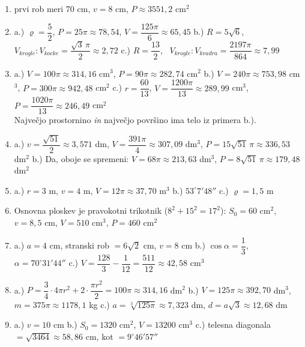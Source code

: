 \documentclass[a4paper,11pt]{letter}
\begin{document}
\begin{enumerate}
\item prvi rob meri 70 cm, $v=8$ cm, $P\approx 3551{,}2$ cm$^2$

\item a.) $\varrho=\dfrac{5}{2}$, $P=25\pi\approx 78{,}54$, $V=\dfrac{125\pi}{6}\approx 65{,}45$ \quad
      b.) $R=5\sqrt{6}$, \ $V_{krogle}:V_{kocke}=\dfrac{\sqrt{3}\,\pi}{2}\approx 2{,}72$ \quad
      c.) $R=\dfrac{13}{2}$, \ $V_{krogle}:V_{kvadra}=\dfrac{2197\pi}{864}\approx 7{,}99$

\item a.) $V=100\pi\approx 314{,}16$ cm$^3$, $P=90\pi\approx 282{,}74$ cm$^2$ \quad
      b.) $V=240\pi\approx 753{,}98$ cm$^3$, $P=300\pi\approx 942{,}48$ cm$^2$ \quad
      c.) $r=\dfrac{60}{13}$, $V=\dfrac{1200\pi}{13}\approx 289{,}99$ cm$^3$,
      $P=\dfrac{1020\pi}{13}\approx 246{,}49$ cm$^2$ \\
      Največjo prostornino \emph{in} največjo površino ima telo iz primera b.).

\item a.) $v=\dfrac{\sqrt{51}}{2}\approx 3{,}571$ dm, $V=\dfrac{391\pi}{4}\approx 307{,}09$ dm$^3$,
      $P=15\sqrt{51}\,\pi\approx 336{,}53$ dm$^2$ \quad
      b.) Da, oboje se spremeni: $V=68\pi\approx 213{,}63$ dm$^3$,
      $P=8\sqrt{51}\,\pi\approx 179{,}48$ dm$^2$

\item a.) $r=3$ m, $v=4$ m, $V=12\pi\approx 37{,}70$ m$^3$ \quad
      b.) $53^{\circ}7'48''$ \quad
      c.) $\varrho=1{,}5$ m

\item Osnovna ploskev je pravokotni trikotnik ($8^2+15^2=17^2$): $S_0=60$ cm$^2$, $v=8{,}5$ cm,
      $V=510$ cm$^3$, $P=460$ cm$^2$

\item a.) $a=4$ cm, stranski rob $=6\sqrt{2}$ cm, $v=8$ cm \quad
      b.) $\cos\alpha=\dfrac{1}{3}$, $\alpha=70^{\circ}31'44''$ \quad
      c.) $V=\dfrac{128}{3}-\dfrac{1}{12}=\dfrac{511}{12}\approx 42{,}58$ cm$^3$

\item a.) $P=\dfrac{3}{4}\cdot 4\pi r^2+2\cdot\dfrac{\pi r^2}{2}=100\pi\approx 314{,}16$ dm$^2$ \quad
      b.) $V=125\pi\approx 392{,}70$ dm$^3$, $m=375\pi\approx 1178{,}1$ kg \quad
      c.) $a=\sqrt[3]{125\pi}\approx 7{,}323$ dm, $d=a\sqrt{3}\approx 12{,}68$ dm

\item a.) $v=10$ cm \quad
      b.) $S_0=1320$ cm$^2$, $V=13200$ cm$^3$ \quad
      c.) telesna diagonala $=\sqrt{3464}\approx 58{,}86$ cm, kot $=9^{\circ}46'57''$


\end{enumerate}
\end{document}
